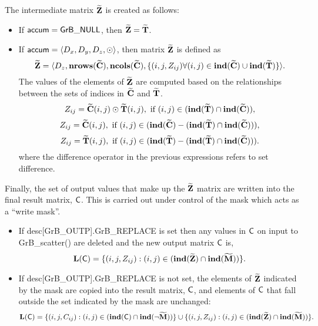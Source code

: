 The intermediate matrix ${\bf \widetilde{Z}}$ is created as follows:
\begin{itemize}
    \item If ${\sf accum} = {\sf GrB\_NULL}$, then 
    ${\bf \widetilde{Z}} = {\bf \widetilde{T}}$.

    \item If ${\sf accum} = \langle D_x, D_y, D_z, \odot \rangle$, then matrix 
    ${\bf \widetilde{Z}}$ is defined as 
        \[ 
        {\bf \widetilde{Z}} =
        \langle D_z, \bold{nrows}({\bf \widetilde{C}}),
        \bold{ncols}({\bf \widetilde{C}}), 
		\{(i,j,Z_{ij})  \forall (i,j) \in \bold{ind}({\bf \widetilde{C}}) \cup 
        \bold{ind}({\bf \widetilde{T}}) \} \rangle.\]
    The values of the elements of ${\bf \widetilde{Z}}$ are computed based on 
    the relationships between the sets of indices in ${\bf \widetilde{C}}$ and 
    ${\bf \widetilde{T}}$.
\[
	Z_{ij} = {\bf \widetilde{C}}(i,j) \odot {\bf \widetilde{T}}(i,j), 
    \mbox{~if~} (i,j) \in  (\bold{ind}({\bf \widetilde{T}}) \cap 
    \bold{ind}({\bf \widetilde{C}})),
\]
\[
	Z_{ij} = {\bf \widetilde{C}}(i,j), \mbox{~if~}  (i,j) \in  
    (\bold{ind}({\bf \widetilde{C}}) - (\bold{ind}({\bf \widetilde{T}}) \cap 
    \bold{ind}({\bf \widetilde{C}}))),
\]
\[
	Z_{ij} = {\bf \widetilde{T}}(i,j), \mbox{~if~}  (i,j) \in  
    (\bold{ind}({\bf \widetilde{T}}) - (\bold{ind}({\bf \widetilde{T}}) \cap 
    \bold{ind}({\bf \widetilde{C}}))).
\]
where the difference operator in the previous expressions refers to set difference.
\end{itemize}

Finally, the set of output values that make up the ${\bf \widetilde{Z}}$ 
matrix are written into the final result matrix, ${\sf C}$. 
This is carried out under control of the mask which acts as a ``write mask''.
\begin{itemize}
\item If {\sf desc[GrB\_OUTP].GrB\_REPLACE} is set then any values in ${\sf C}$ 
on input to {\sf GrB\_scatter()} are deleted and the new output matrix ${\sf C}$ is,
		\[ \bold{L}({\sf C}) = \{(i,j,Z_{ij}) : (i,j) \in (\bold{ind}({\bf \widetilde{Z}}) 
\cap \bold{ind}({\bf \widetilde{M}})) \}. \]

\item If {\sf desc[GrB\_OUTP].GrB\_REPLACE} is not set, the elements of 
${\bf \widetilde{Z}}$ indicated by 
the mask are copied into the result matrix, ${\sf C}$, and elements of 
${\sf C}$ that fall outside the set indicated by the mask are unchanged:
		\[ \bold{L}({\sf C}) = \{(i,j,C_{ij}) : (i,j) \in (\bold{ind}({\bf \sf C}) 
		\cap \bold{ind}(\neg {\bf \widetilde{M}})) \} \cup \{(i,j,Z_{ij}) : (i,j) \in 
(\bold{ind}({\bf \widetilde{Z}}) \cap \bold{ind}({\bf \widetilde{M}})) \}. \]
\end{itemize}

